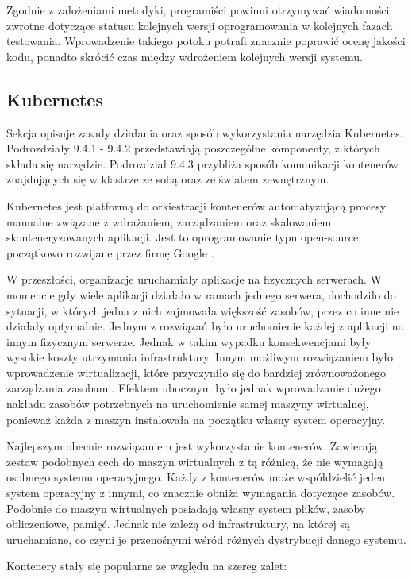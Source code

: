 Zgodnie z założeniami metodyki, programiści powinni otrzymywać
wiadomości zwrotne dotyczące statusu kolejnych wersji 
oprogramowania w kolejnych fazach testowania. Wprowadzenie takiego potoku potrafi znacznie
poprawić ocenę jakości kodu, ponadto skrócić czas między wdrożeniem kolejnych wersji systemu.

\subsection{Kubernetes}
Sekcja opisuje zasady działania oraz sposób wykorzystania narzędzia Kubernetes.
Podrozdziały 9.4.1 - 9.4.2 przedstawiają poszczególne komponenty, z których
składa się narzędzie. Podrozdział 9.4.3 przybliża sposób komunikacji
kontenerów znajdujących się w klastrze ze sobą oraz ze światem zewnętrznym.

Kubernetes jest platformą do orkiestracji kontenerów automatyzującą procesy manualne 
związane z wdrażaniem, zarządzaniem oraz skalowaniem skonteneryzowanych aplikacji. 
Jest to oprogramowanie typu open-source, początkowo rozwijane przez firmę Google
\cite{kubernetes2022}.

W przeszłości, organizacje uruchamiały aplikacje na fizycznych serwerach. W momencie 
gdy wiele aplikacji działało w ramach jednego serwera, dochodziło do 
sytuacji, w których jedna z nich zajmowała większość zasobów, przez co inne 
nie działały optymalnie. Jednym z rozwiązań było uruchomienie każdej 
z aplikacji na innym fizycznym serwerze. Jednak w takim wypadku konsekwencjami były 
wysokie koszty utrzymania infrastruktury. Innym możliwym rozwiązaniem było wprowadzenie 
wirtualizacji, które przyczyniło się do bardziej zrównoważonego zarządzania zasobami. 
Efektem ubocznym było jednak wprowadzanie dużego nakładu zasobów potrzebnych na 
uruchomienie samej maszyny wirtualnej, ponieważ każda z maszyn instalowała na początku 
własny system operacyjny.

Najlepszym obecnie rozwiązaniem jest wykorzystanie kontenerów. Zawierają zestaw 
podobnych cech do maszyn wirtualnych z tą różnicą, że nie wymagają osobnego systemu 
operacyjnego. Każdy z kontenerów może współdzielić jeden system operacyjny z 
innymi, co znacznie obniża wymagania dotyczące zasobów. Podobnie do maszyn 
wirtualnych posiadają własny system plików, zasoby obliczeniowe, pamięć. Jednak nie 
zależą od infrastruktury, na której są uruchamiane, co czyni je przenośnymi wśród 
różnych dystrybucji danego systemu.

Kontenery stały się popularne ze względu na szereg zalet:

